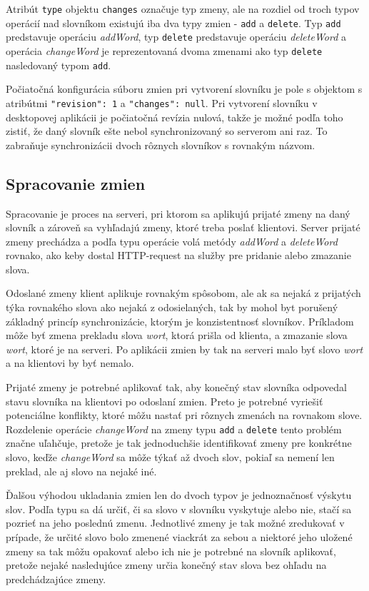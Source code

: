 \documentclass[
  digital, %
  table,   %
  lof,     %
  lot,     %
]{fithesis3}
\begin{document}
Atribút \texttt{type} objektu \texttt{changes} označuje typ zmeny, ale na rozdiel od troch typov operácií nad slovníkom existujú iba dva typy zmien - \texttt{add} a \texttt{delete}. Typ \texttt{add} predstavuje operáciu \textit{addWord}, typ \texttt{delete} predstavuje operáciu \textit{deleteWord} a operácia \textit{changeWord} je reprezentovaná dvoma zmenami ako typ \texttt{delete} nasledovaný typom \texttt{add}.

Počiatočná konfigurácia súboru zmien pri vytvorení slovníku je pole s objektom s atribútmi \texttt{"revision": 1} a \texttt{"changes": null}. Pri vytvorení slovníku v desktopovej aplikácii je počiatočná revízia nulová, takže je možné podľa toho zistiť, že daný slovník ešte nebol synchronizovaný so serverom ani raz. To zabraňuje synchronizácii dvoch rôznych slovníkov s rovnakým názvom.

\subsection{Spracovanie zmien}
Spracovanie je proces na serveri, pri ktorom sa aplikujú prijaté zmeny na daný slovník a zároveň sa vyhľadajú zmeny, ktoré treba poslať klientovi. Server prijaté zmeny prechádza a podľa typu operácie volá metódy \textit{addWord} a \textit{deleteWord} rovnako, ako keby dostal HTTP-request na služby pre pridanie alebo zmazanie slova.

Odoslané zmeny klient aplikuje rovnakým spôsobom, ale ak sa nejaká z prijatých týka rovnakého slova ako nejaká z odosielaných, tak by mohol byt porušený základný princíp synchronizácie, ktorým je konzistentnosť slovníkov. Príkladom môže byť zmena prekladu slova \textit{wort}, ktorá prišla od klienta, a zmazanie slova \textit{wort}, ktoré je na serveri. Po aplikácii zmien by tak na serveri malo byť slovo \textit{wort} a na klientovi by byť nemalo.

Prijaté zmeny je potrebné aplikovať tak, aby konečný stav slovníka odpovedal stavu slovníka na klientovi po odoslaní zmien. Preto je potrebné vyriešiť potenciálne konflikty, ktoré môžu nastať pri rôznych zmenách na rovnakom slove. Rozdelenie operácie \textit{changeWord} na zmeny typu \texttt{add} a \texttt{delete} tento problém značne uľahčuje, pretože je tak jednoduchšie identifikovať zmeny pre konkrétne slovo, keďže \textit{changeWord} sa môže týkať až dvoch slov, pokiaľ sa nemení len preklad, ale aj slovo na nejaké iné.

Ďalšou výhodou ukladania zmien len do dvoch typov je jednoznačnosť výskytu slov. Podľa typu sa dá určiť, či sa slovo v slovníku vyskytuje alebo nie, stačí sa pozrieť na jeho poslednú zmenu. Jednotlivé zmeny je tak možné zredukovať v prípade, že určité slovo bolo zmenené viackrát za sebou a niektoré jeho uložené zmeny sa tak môžu opakovať alebo ich nie je potrebné na slovník aplikovať, pretože nejaké nasledujúce zmeny určia konečný stav slova bez ohľadu na predchádzajúce zmeny.
\end{document}
